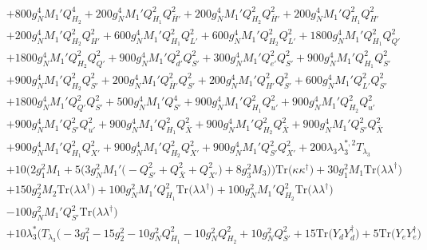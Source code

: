 {\begin{align}
 &+800 g_{N}^{4} M_1' Q_{H_2}^{4} +200 g_{N}^{4} M_1' Q_{H_1}^{2} Q_{\bar{H}'}^{2} +200 g_{N}^{4} M_1' Q_{H_2}^{2} Q_{\bar{H}'}^{2} +200 g_{N}^{4} M_1' Q_{H_1}^{2} Q_{H'}^{2} \nonumber \\ 
 &+200 g_{N}^{4} M_1' Q_{H_2}^{2} Q_{H'}^{2} +600 g_{N}^{4} M_1' Q_{H_1}^{2} Q_{L'}^{2} +600 g_{N}^{4} M_1' Q_{H_2}^{2} Q_{L'}^{2} +1800 g_{N}^{4} M_1' Q_{H_1}^{2} Q_{Q'}^{2} \nonumber \\ 
 &+1800 g_{N}^{4} M_1' Q_{H_2}^{2} Q_{Q'}^{2} +900 g_{N}^{4} M_1' Q_{d'}^{2} Q_{S'}^{2} +300 g_{N}^{4} M_1' Q_{e'}^{2} Q_{S'}^{2} +900 g_{N}^{4} M_1' Q_{H_1}^{2} Q_{S'}^{2} \nonumber \\ 
 &+900 g_{N}^{4} M_1' Q_{H_2}^{2} Q_{S'}^{2} +200 g_{N}^{4} M_1' Q_{\bar{H}'}^{2} Q_{S'}^{2} +200 g_{N}^{4} M_1' Q_{H'}^{2} Q_{S'}^{2} +600 g_{N}^{4} M_1' Q_{L'}^{2} Q_{S'}^{2} \nonumber \\ 
 &+1800 g_{N}^{4} M_1' Q_{Q'}^{2} Q_{S'}^{2} +500 g_{N}^{4} M_1' Q_{S'}^{4} +900 g_{N}^{4} M_1' Q_{H_1}^{2} Q_{u'}^{2} +900 g_{N}^{4} M_1' Q_{H_2}^{2} Q_{u'}^{2} \nonumber \\ 
 &+900 g_{N}^{4} M_1' Q_{S'}^{2} Q_{u'}^{2} +900 g_{N}^{4} M_1' Q_{H_1}^{2} Q_{\bar{X}}^{2} +900 g_{N}^{4} M_1' Q_{H_2}^{2} Q_{\bar{X}}^{2} +900 g_{N}^{4} M_1' Q_{S'}^{2} Q_{\bar{X}}^{2} \nonumber \\ 
 &+900 g_{N}^{4} M_1' Q_{H_1}^{2} Q_{X'}^{2} +900 g_{N}^{4} M_1' Q_{H_2}^{2} Q_{X'}^{2} +900 g_{N}^{4} M_1' Q_{S'}^{2} Q_{X'}^{2} +200 \lambda_3 \lambda_{3}^{*,2} T_{\lambda_3} \nonumber \\ 
 &+10 \Big(2 g_{1}^{2} M_1  + 5 \Big(3 g_{N}^{2} M_1' \Big(- Q_{S'}^{2}  + Q_{\bar{X}}^{2} + Q_{X'}^{2}\Big) + 8 g_{3}^{2} M_3 \Big)\Big)\mbox{Tr}\Big({\kappa  \kappa^{\dagger}}\Big) +30 g_{1}^{2} M_1 \mbox{Tr}\Big({\lambda  \lambda^{\dagger}}\Big) \nonumber \\ 
 &+150 g_{2}^{2} M_2 \mbox{Tr}\Big({\lambda  \lambda^{\dagger}}\Big) +100 g_{N}^{2} M_1' Q_{H_1}^{2} \mbox{Tr}\Big({\lambda  \lambda^{\dagger}}\Big) +100 g_{N}^{2} M_1' Q_{H_2}^{2} \mbox{Tr}\Big({\lambda  \lambda^{\dagger}}\Big) \nonumber \\ 
 &-100 g_{N}^{2} M_1' Q_{S'}^{2} \mbox{Tr}\Big({\lambda  \lambda^{\dagger}}\Big) \nonumber \\ 
 &+10 \lambda_3^* \Big(T_{\lambda_3} \Big(-3 g_{1}^{2} -15 g_{2}^{2} -10 g_{N}^{2} Q_{H_1}^{2} -10 g_{N}^{2} Q_{H_2}^{2} +10 g_{N}^{2} Q_{S'}^{2} +15 \mbox{Tr}\Big({Y_d  Y_{d}^{\dagger}}\Big) +5 \mbox{Tr}\Big({Y_e  Y_{e}^{\dagger}}\Big) \nonumber \\ 

\end{align}}
